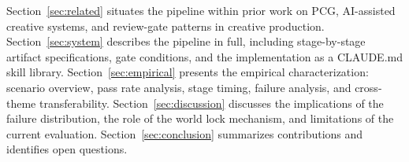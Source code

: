 Section~\ref{sec:related} situates the pipeline within prior work on PCG, AI-assisted
creative systems, and review-gate patterns in creative production. Section~\ref{sec:system}
describes the pipeline in full, including stage-by-stage artifact specifications, gate
conditions, and the implementation as a CLAUDE.md skill library. Section~\ref{sec:empirical}
presents the empirical characterization: scenario overview, pass rate analysis, stage timing,
failure analysis, and cross-theme transferability. Section~\ref{sec:discussion} discusses
the implications of the failure distribution, the role of the world lock mechanism, and
limitations of the current evaluation. Section~\ref{sec:conclusion} summarizes contributions
and identifies open questions.
